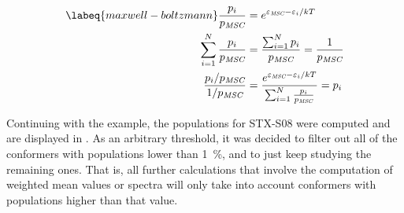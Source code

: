 \begin{align}
\begin{split}
    \labeq{maxwell-boltzmann}
    \frac{p_i}{p_\textit{MSC}}&=e^{\varepsilon_\textit{MSC}-\varepsilon_i/kT} \\
    \sum_{i=1}^{N}\frac{p_i}{p_\textit{MSC}}&=\frac{\sum_{i=1}^{N}p_i}{p_\textit{MSC}}=\frac{1}{p_\textit{MSC}} \\
    \frac{p_i/p_\textit{MSC}}{1/p_\textit{MSC}}&=\frac{e^{\varepsilon_\textit{MSC}-\varepsilon_i/kT}}{\sum_{i=1}^{N}\frac{p_i}{p_\textit{MSC}}}=p_i \\
\end{split}
\end{align}

Continuing with the example, the populations for STX-S08 were computed and are displayed in .
As an arbitrary threshold, it was decided to filter out all of the conformers with populations lower than \SI{1}{\percent}, and to just keep studying the remaining ones.
That is, all further calculations that involve the computation of weighted mean values or spectra will only take into account conformers with populations higher than that value.

